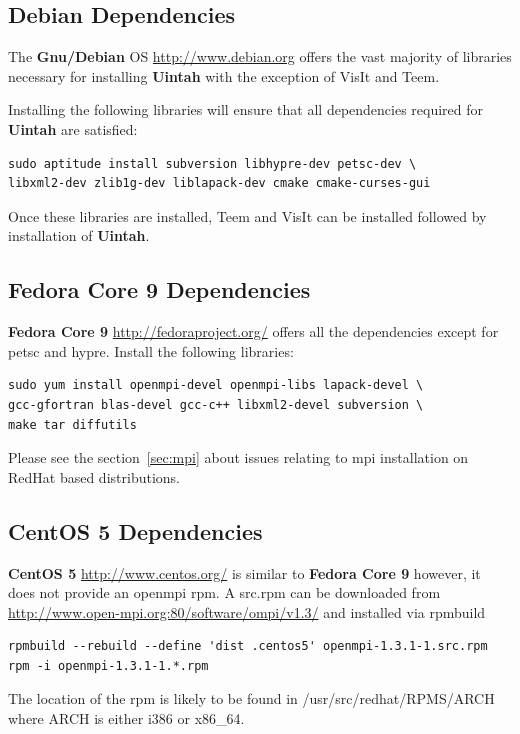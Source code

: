 \documentclass[12pt]{article}
\begin{document}
\subsection{Debian Dependencies}

The \textbf{Gnu/Debian} OS \url{http://www.debian.org} offers the vast majority of libraries necessary for
installing \textbf{Uintah} with the exception of VisIt and Teem.

Installing the following libraries will ensure that all dependencies
required for \textbf{Uintah} are satisfied: 

\begin{verbatim} 
sudo aptitude install subversion libhypre-dev petsc-dev \ 
libxml2-dev zlib1g-dev liblapack-dev cmake cmake-curses-gui
\end{verbatim}

Once these libraries are installed, Teem and VisIt can be installed
followed by installation of \textbf{Uintah}.

\subsection{Fedora Core 9 Dependencies}

\textbf{Fedora Core 9} \url{http://fedoraproject.org/} offers all the
dependencies except for petsc and hypre.  Install the following
libraries:
\begin{verbatim}
sudo yum install openmpi-devel openmpi-libs lapack-devel \
gcc-gfortran blas-devel gcc-c++ libxml2-devel subversion \ 
make tar diffutils
\end{verbatim}

Please see the section~\ref{sec:mpi} about issues relating to mpi
installation on RedHat based distributions.


\subsection{CentOS 5 Dependencies}

\textbf{CentOS 5} \url{http://www.centos.org/} is similar to \textbf{Fedora
Core 9} however, it does not provide an openmpi rpm.  A src.rpm can be
downloaded from \url{http://www.open-mpi.org:80/software/ompi/v1.3/}
and installed via rpmbuild

\begin{Verbatim}
rpmbuild --rebuild --define 'dist .centos5' openmpi-1.3.1-1.src.rpm
rpm -i openmpi-1.3.1-1.*.rpm
\end{Verbatim}
The location of the rpm is likely to be found in
/usr/src/redhat/RPMS/ARCH where ARCH is either i386 or x86\_64.
\end{document}
